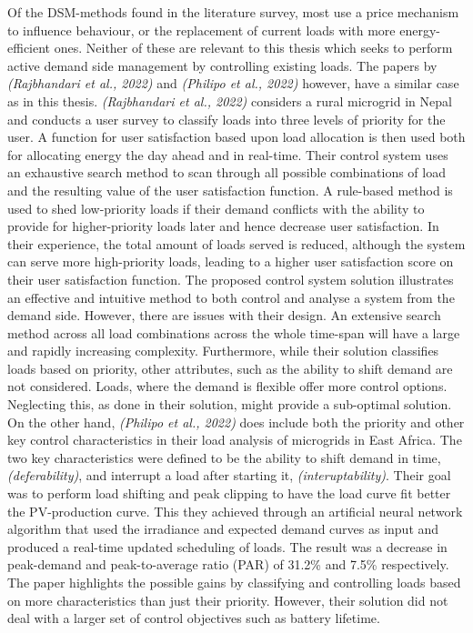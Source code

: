 Of the DSM-methods found in the literature survey, most use  a price mechanism to influence behaviour, or the replacement of current loads with more energy-efficient ones. Neither of these are relevant to this thesis which seeks to perform active demand side management by controlling existing loads. The papers by \textit{(Rajbhandari et al., 2022)} and \textit{(Philipo et al., 2022)} however, have a similar case as in this thesis. \textit{(Rajbhandari et al., 2022)} considers a rural microgrid in Nepal and conducts a user survey to classify loads into three levels of priority for the user. A function for user satisfaction based upon load allocation is then used both for allocating energy the day ahead and in real-time. Their control system uses an exhaustive search method to scan through all possible combinations of load and the resulting value of the user satisfaction function. A rule-based method is used to shed low-priority loads if their demand conflicts with the ability to provide for higher-priority loads later and hence decrease user satisfaction. In their experience, the total amount of loads served is reduced, although the system can serve more high-priority loads, leading to a higher user satisfaction score on their user satisfaction function.  The proposed control system solution illustrates an effective and intuitive method to both  control and analyse a system from the demand side. However, there are issues with their design. An extensive search method across all load combinations across the whole time-span will have a large and rapidly increasing complexity. Furthermore, while their solution classifies loads based on priority, other attributes, such as the ability to shift demand are not considered. Loads, where the demand is flexible offer more control options. Neglecting this, as done in their solution, might provide a sub-optimal solution.\cite{Rajbhandari2022-oo}\\

On the other hand, \textit{(Philipo et al., 2022)}  does include both the priority and other key control characteristics in their load analysis of microgrids in East Africa. The two key characteristics were defined to be the ability to shift demand in time, \textit{(deferability)}, and interrupt a load after starting it, \textit{(interuptability)}. Their goal was to perform load shifting and peak clipping to have the load curve fit better the PV-production curve. This they achieved through an artificial neural network algorithm that used the irradiance and expected demand curves as input and produced a real-time updated scheduling of loads. The result was a decrease in peak-demand and peak-to-average ratio (PAR) of 31.2\% and 7.5\% respectively. The paper highlights the possible gains by classifying and controlling loads based on more characteristics than just their priority. However, their solution did not deal with a larger set of control objectives such as battery lifetime.\cite{Philipo2022-rx}\\

